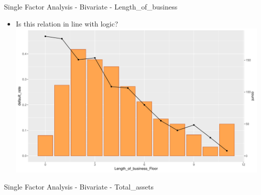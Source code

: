 \documentclass[9pt,ignorenonframetext,]{beamer}
\newenvironment{Shaded}{\begin{snugshade}}{\end{snugshade}}
\newcommand{\KeywordTok}[1]{\textcolor[rgb]{0.13,0.29,0.53}{\textbf{#1}}}
\newcommand{\DataTypeTok}[1]{\textcolor[rgb]{0.13,0.29,0.53}{#1}}
\newcommand{\DecValTok}[1]{\textcolor[rgb]{0.00,0.00,0.81}{#1}}
\newcommand{\StringTok}[1]{\textcolor[rgb]{0.31,0.60,0.02}{#1}}
\newcommand{\OtherTok}[1]{\textcolor[rgb]{0.56,0.35,0.01}{#1}}
\newcommand{\OperatorTok}[1]{\textcolor[rgb]{0.81,0.36,0.00}{\textbf{#1}}}
\newcommand{\NormalTok}[1]{#1}
\providecommand{\tightlist}{%
  \setlength{\itemsep}{0pt}\setlength{\parskip}{0pt}}
\begin{document}
\begin{frame}{Single Factor Analysis - Bivariate - Length\_of\_business}

\begin{itemize}
\tightlist
\item
  Is this relation in line with logic?
  \includegraphics{Risk-Models-Development-Process_files/figure-beamer/unnamed-chunk-27-1.pdf}
\end{itemize}

\end{frame}

\begin{frame}[fragile]{Single Factor Analysis - Bivariate -
Total\_assets}

\begin{Shaded}
\end{Shaded}

\end{frame}
\end{document}

